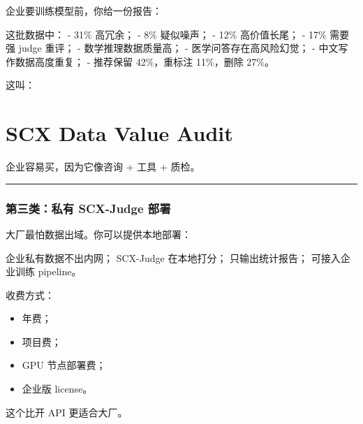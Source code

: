 \documentclass[
  12pt,
]{ctexart}
\newenvironment{Shaded}{}{}
\newcommand{\NormalTok}[1]{#1}
\providecommand{\tightlist}{%
  \setlength{\itemsep}{0pt}\setlength{\parskip}{0pt}}
\begin{document}
企业要训练模型前，你给一份报告：

\begin{Shaded}
\begin{Highlighting}[]
\NormalTok{这批数据中：}
\NormalTok{{-} 31\% 高冗余；}
\NormalTok{{-} 8\% 疑似噪声；}
\NormalTok{{-} 12\% 高价值长尾；}
\NormalTok{{-} 17\% 需要强 judge 重评；}
\NormalTok{{-} 数学推理数据质量高；}
\NormalTok{{-} 医学问答存在高风险幻觉；}
\NormalTok{{-} 中文写作数据高度重复；}
\NormalTok{{-} 推荐保留 42\%，重标注 11\%，删除 27\%。}
\end{Highlighting}
\end{Shaded}

这叫：

\section{\texorpdfstring{\textbf{SCX Data Value
Audit}}{SCX Data Value Audit}}\label{scx-data-value-audit}

企业容易买，因为它像咨询 + 工具 + 质检。

\begin{center}\rule{0.5\linewidth}{0.5pt}\end{center}

\subsubsection{第三类：私有 SCX-Judge
部署}\label{ux7b2cux4e09ux7c7bux79c1ux6709-scx-judge-ux90e8ux7f72}

大厂最怕数据出域。你可以提供本地部署：

\begin{Shaded}
\begin{Highlighting}[]
\NormalTok{企业私有数据不出内网；}
\NormalTok{SCX{-}Judge 在本地打分；}
\NormalTok{只输出统计报告；}
\NormalTok{可接入企业训练 pipeline。}
\end{Highlighting}
\end{Shaded}

收费方式：

\begin{itemize}
\tightlist
\item
  年费；
\item
  项目费；
\item
  GPU 节点部署费；
\item
  企业版 license。
\end{itemize}

这个比开 API 更适合大厂。
\end{document}
